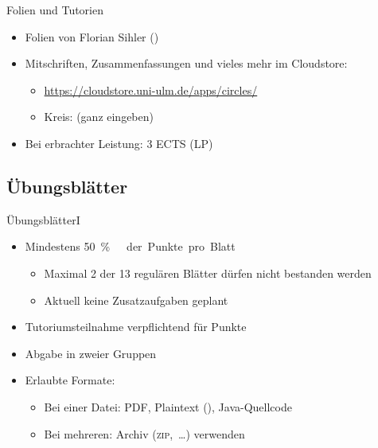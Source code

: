 \begin{frame}[t]{Folien und Tutorien}
    \begin{itemize}[<+(1)->]
        \itemsep=18pt
        \item Folien von Florian Sihler ()
        \item Mitschriften, Zusammenfassungen und vieles mehr im Cloudstore: \begin{itemize}[<1->]
            \item \url{https://cloudstore.uni-ulm.de/apps/circles/}
            \item Kreis:  (ganz eingeben)
        \end{itemize}
        \item Bei erbrachter Leistung: 3 ECTS (LP)
    \end{itemize}
\end{frame}


\savebox{}
\savebox{}
\subsection{Übungsblätter}
\begin{frame}[t]{Übungsblätter\hfill I}
\begin{itemize}[<+(1)->]
    \item Mindestens \qty{50}\percent\ der Punkte pro Blatt\begin{itemize}
        \item Maximal 2 der 13 regulären Blätter dürfen nicht bestanden werden
        \item Aktuell keine Zusatzaufgaben geplant\vfill
    \end{itemize}
    \item Tutoriumsteilnahme verpflichtend für Punkte\vfill
    \item Abgabe in zweier Gruppen \vfill
    \item<7-> Erlaubte Formate: {\begin{itemize}
        \item<8-> Bei einer Datei: PDF, Plaintext (), Java-Quellcode
        \item<9-> Bei mehreren: Archiv (\textsc{zip},~\ldots) verwenden%
    \end{itemize}}\vfill
\end{itemize}
\end{frame}

